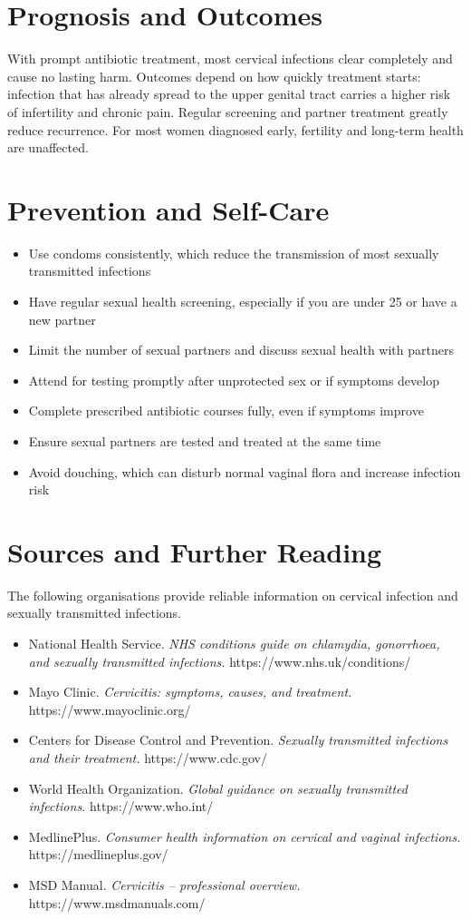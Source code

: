 \section*{Prognosis and Outcomes}
With prompt antibiotic treatment, most cervical infections clear completely and cause no lasting harm. Outcomes depend on how quickly treatment starts: infection that has already spread to the upper genital tract carries a higher risk of infertility and chronic pain. Regular screening and partner treatment greatly reduce recurrence. For most women diagnosed early, fertility and long-term health are unaffected.

\section*{Prevention and Self-Care}
\begin{itemize}
    \item Use condoms consistently, which reduce the transmission of most sexually transmitted infections
    \item Have regular sexual health screening, especially if you are under 25 or have a new partner
    \item Limit the number of sexual partners and discuss sexual health with partners
    \item Attend for testing promptly after unprotected sex or if symptoms develop
    \item Complete prescribed antibiotic courses fully, even if symptoms improve
    \item Ensure sexual partners are tested and treated at the same time
    \item Avoid douching, which can disturb normal vaginal flora and increase infection risk
\end{itemize}

\section*{Sources and Further Reading}
The following organisations provide reliable information on cervical infection and sexually transmitted infections.

\begin{itemize}
    \item National Health Service. \textit{NHS conditions guide on chlamydia, gonorrhoea, and sexually transmitted infections.} https://www.nhs.uk/conditions/
    \item Mayo Clinic. \textit{Cervicitis: symptoms, causes, and treatment.} https://www.mayoclinic.org/
    \item Centers for Disease Control and Prevention. \textit{Sexually transmitted infections and their treatment.} https://www.cdc.gov/
    \item World Health Organization. \textit{Global guidance on sexually transmitted infections.} https://www.who.int/
    \item MedlinePlus. \textit{Consumer health information on cervical and vaginal infections.} https://medlineplus.gov/
    \item MSD Manual. \textit{Cervicitis -- professional overview.} https://www.msdmanuals.com/
\end{itemize}
